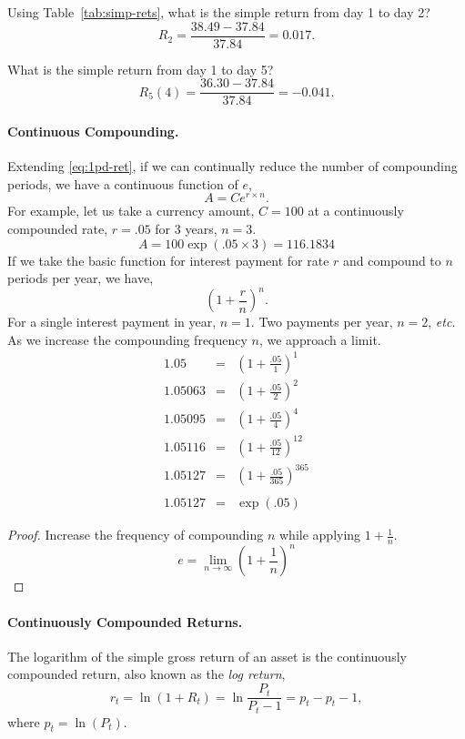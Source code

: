 Using Table~\ref{tab:simp-rets}, what is the simple return from day 1 to day 2? 
\[
R_2 = \frac{38.49-37.84}{37.84} = 0.017.
\]

What is the simple return from day 1 to day 5? 
\[
R_5(4) = \frac{36.30-37.84}{37.84} = -0.041.
\]

\paragraph{Continuous Compounding.}
Extending \eqref{eq:1pd-ret}, if we can continually reduce the number of compounding periods, we have a continuous function of $e$,
\begin{equation}
A = C e^{r \times n}.
\end{equation}
For example, let us take a currency amount, $C=100$ at a continuously compounded rate, $r=.05$ for 3 years, $n=3$.
\[
A = 100 \exp(.05 \times 3) = 116.1834
\]
If we take the basic function for interest payment for rate $r$ and compound to $n$ periods per year, we have,
\[
\left(1+\frac{r}{n}\right)^n.
\]
For a single interest payment in year, $n=1$. Two payments per year, $n=2$, \textit{etc.} As we increase the compounding frequency $n$, we approach a limit.
\begin{eqnarray*}
1.05 &=&\left(1+\frac{.05}{1}\right)^1 \\
1.05063 &=&\left(1+\frac{.05}{2}\right)^2 \\
1.05095 &=&\left(1+\frac{.05}{4}\right)^4 \\
1.05116 &=&\left(1+\frac{.05}{12}\right)^{12} \\
1.05127 &=&\left(1+\frac{.05}{365}\right)^{365} \\
\\
1.05127 &=& \exp(.05)
\end{eqnarray*}

\begin{proof}
Increase the frequency of compounding $n$ while applying $1 + \frac{1}{n}$.
\[
e= \lim_{n \to \infty}\left (1+ \frac{1}{n} \right )^n
\]
\end{proof}

\paragraph{Continuously Compounded Returns.} The logarithm of the simple gross return of an asset is the continuously compounded return, also known as the \emph{log return},
\begin{equation}
r_t = \ln(1 + R_t ) = \ln \frac{P_t}{P_t-1}= p_t - p_t-1, 
\label{eq:log-return}
\end{equation}
where $p_t = \ln(P_t)$.

